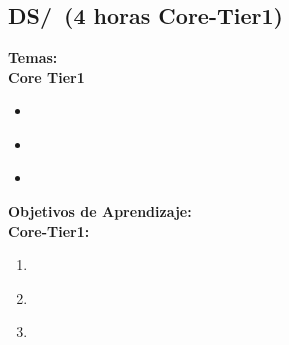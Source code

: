 \section{\DS}\label{sec:BOK:DS}
\DSBOKDescription


\subsection{DS/\DSSetsRelationsandFunctions~(4 horas Core-Tier1)}\label{sec:BOK:DSSetsRelationsandFunctions}
\noindent \textbf{Temas:}\\
\noindent \textbf{Core Tier1}
\begin{itemize}
	\item \DSSetsRelationsandFunctionsTopicSets\label{sec:BOK:DSSetsRelationsandFunctionsTopicSets}
	\item \DSSetsRelationsandFunctionsTopicRelations\label{sec:BOK:DSSetsRelationsandFunctionsTopicRelations}
	\item \DSSetsRelationsandFunctionsTopicFunctions\label{sec:BOK:DSSetsRelationsandFunctionsTopicFunctions}
\end{itemize}


\noindent \textbf{Objetivos de Aprendizaje:}\\
\noindent \textbf{Core-Tier1:}
\begin{enumerate}
	\setcounter{enumi}{0}
	\item \DSSetsRelationsandFunctionsLOExplainWith\xspace[\DSSetsRelationsandFunctionsLOExplainWithLevel]\label{sec:BOK:DSSetsRelationsandFunctionsLOExplainWith}
	\item \DSSetsRelationsandFunctionsLOPerformThe\xspace[\DSSetsRelationsandFunctionsLOPerformTheLevel]\label{sec:BOK:DSSetsRelationsandFunctionsLOPerformThe}
	\item \DSSetsRelationsandFunctionsLORelate\xspace[\DSSetsRelationsandFunctionsLORelateLevel]\label{sec:BOK:DSSetsRelationsandFunctionsLORelate}
\end{enumerate}


